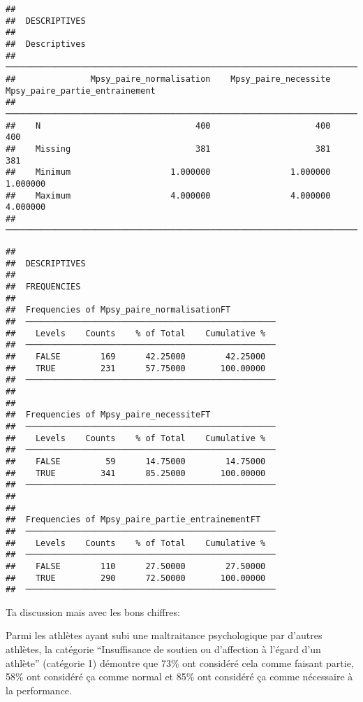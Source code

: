 \documentclass[
]{article}
\begin{document}
\begin{verbatim}
## 
##  DESCRIPTIVES
## 
##  Descriptives                                                                                      
##  ───────────────────────────────────────────────────────────────────────────────────────────────── 
##               Mpsy_paire_normalisation    Mpsy_paire_necessite    Mpsy_paire_partie_entrainement   
##  ───────────────────────────────────────────────────────────────────────────────────────────────── 
##    N                               400                     400                               400   
##    Missing                         381                     381                               381   
##    Minimum                    1.000000                1.000000                          1.000000   
##    Maximum                    4.000000                4.000000                          4.000000   
##  ─────────────────────────────────────────────────────────────────────────────────────────────────
\end{verbatim}

\begin{verbatim}
## 
##  DESCRIPTIVES
## 
##  FREQUENCIES
## 
##  Frequencies of Mpsy_paire_normalisationFT          
##  ────────────────────────────────────────────────── 
##    Levels    Counts    % of Total    Cumulative %   
##  ────────────────────────────────────────────────── 
##    FALSE        169      42.25000        42.25000   
##    TRUE         231      57.75000       100.00000   
##  ────────────────────────────────────────────────── 
## 
## 
##  Frequencies of Mpsy_paire_necessiteFT              
##  ────────────────────────────────────────────────── 
##    Levels    Counts    % of Total    Cumulative %   
##  ────────────────────────────────────────────────── 
##    FALSE         59      14.75000        14.75000   
##    TRUE         341      85.25000       100.00000   
##  ────────────────────────────────────────────────── 
## 
## 
##  Frequencies of Mpsy_paire_partie_entrainementFT    
##  ────────────────────────────────────────────────── 
##    Levels    Counts    % of Total    Cumulative %   
##  ────────────────────────────────────────────────── 
##    FALSE        110      27.50000        27.50000   
##    TRUE         290      72.50000       100.00000   
##  ──────────────────────────────────────────────────
\end{verbatim}

Ta discussion mais avec les bons chiffres:

Parmi les athlètes ayant subi une maltraitance psychologique par
d'autres athlètes, la catégorie ``Insuffisance de soutien ou d'affection
à l'égard d'un athlète'' (catégorie 1) démontre que 73\% ont considéré
cela comme faisant partie, 58\% ont considéré ça comme normal et 85\%
ont considéré ça comme nécessaire à la performance.
\end{document}
